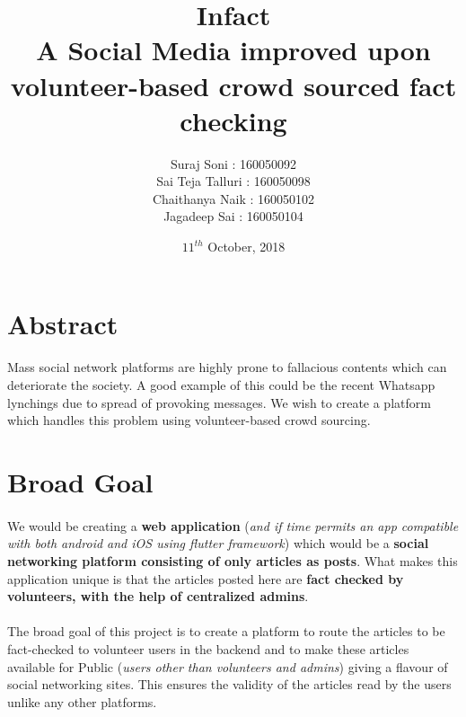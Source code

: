 \documentclass[titlepage,12pt]{article}
\begin{document}
\title{ \Huge {\textbf{Infact}} \\[0.3in] \Large{A Social Media improved upon volunteer-based crowd sourced fact checking}}
\author{ Suraj Soni : 160050092 \\ Sai Teja Talluri : 160050098 \\ Chaithanya Naik : 160050102 \\ Jagadeep Sai : 160050104}
\date{$11^{th}$ October, 2018}
\maketitle

\tableofcontents

\newpage

\section{\textbf{Abstract}}
\paragraph{}
Mass social network platforms are highly prone to fallacious contents which can deteriorate the society. A good example of this could be the recent Whatsapp lynchings due to spread of provoking messages. We wish to create a platform which handles this problem using volunteer-based crowd sourcing.

\section{Broad Goal}
\paragraph{}
We would be creating a \textbf{web application} (\textit{and if time permits an app compatible with both android and iOS using flutter framework}) which would be a \textbf{social networking 
platform consisting of only articles as posts}. What makes this application unique is that the articles posted here are \textbf{fact checked by volunteers, with the help of centralized admins}.

\paragraph{}
The broad goal of this project is to create a platform to route the articles to be fact-checked to volunteer users in the backend and to make these articles available for Public 
(\textit{users other than volunteers and admins}) giving a flavour of social networking sites. This ensures the validity of the articles read by the users unlike any other platforms. 
\end{document}
